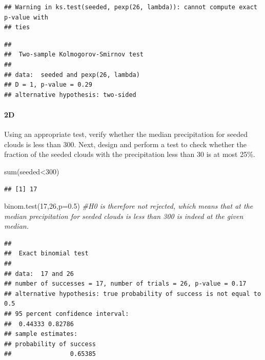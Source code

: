 \documentclass[
]{article}
\newenvironment{Shaded}{\begin{snugshade}}{\end{snugshade}}
\newcommand{\AttributeTok}[1]{\textcolor[rgb]{0.77,0.63,0.00}{#1}}
\newcommand{\CommentTok}[1]{\textcolor[rgb]{0.56,0.35,0.01}{\textit{#1}}}
\newcommand{\DecValTok}[1]{\textcolor[rgb]{0.00,0.00,0.81}{#1}}
\newcommand{\FloatTok}[1]{\textcolor[rgb]{0.00,0.00,0.81}{#1}}
\newcommand{\FunctionTok}[1]{\textcolor[rgb]{0.00,0.00,0.00}{#1}}
\newcommand{\NormalTok}[1]{#1}
\newcommand{\SpecialCharTok}[1]{\textcolor[rgb]{0.00,0.00,0.00}{#1}}
\begin{document}
\begin{verbatim}
## Warning in ks.test(seeded, pexp(26, lambda)): cannot compute exact p-value with
## ties
\end{verbatim}

\begin{verbatim}
## 
##  Two-sample Kolmogorov-Smirnov test
## 
## data:  seeded and pexp(26, lambda)
## D = 1, p-value = 0.29
## alternative hypothesis: two-sided
\end{verbatim}

\hypertarget{d-1}{%
\paragraph{\texorpdfstring{\textbf{2D}}{2D}}\label{d-1}}

Using an appropriate test, verify whether the median precipitation for
seeded clouds is less than 300. Next, design and perform a test to check
whether the fraction of the seeded clouds with the precipitation less
than 30 is at most 25\%.

\begin{Shaded}
\begin{Highlighting}[]
\FunctionTok{sum}\NormalTok{(seeded}\SpecialCharTok{\textless{}}\DecValTok{300}\NormalTok{) }
\end{Highlighting}
\end{Shaded}

\begin{verbatim}
## [1] 17
\end{verbatim}

\begin{Shaded}
\begin{Highlighting}[]
\FunctionTok{binom.test}\NormalTok{(}\DecValTok{17}\NormalTok{,}\DecValTok{26}\NormalTok{,}\AttributeTok{p=}\FloatTok{0.5}\NormalTok{) }\CommentTok{\#H0 is therefore not rejected, which means that at the median  precipitation for seeded clouds is less than 300 is indeed at the given median.  }
\end{Highlighting}
\end{Shaded}

\begin{verbatim}
## 
##  Exact binomial test
## 
## data:  17 and 26
## number of successes = 17, number of trials = 26, p-value = 0.17
## alternative hypothesis: true probability of success is not equal to 0.5
## 95 percent confidence interval:
##  0.44333 0.82786
## sample estimates:
## probability of success 
##                0.65385
\end{verbatim}
\end{document}
